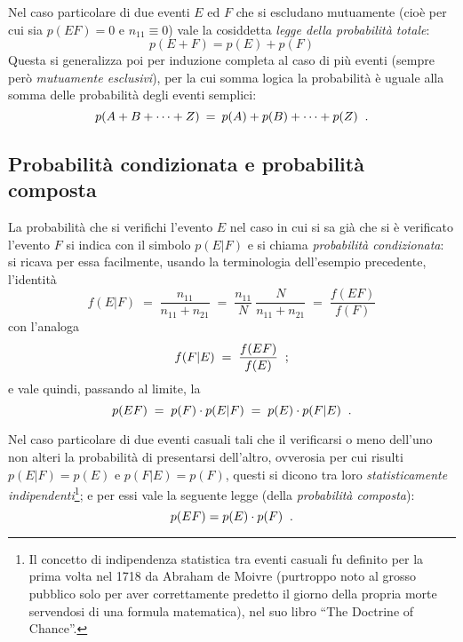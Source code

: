 Nel caso particolare di due eventi $E$ ed $F$ che si
escludano mutuamente (cio\`e per cui sia $p(EF) = 0$ e
$n_{11} \equiv 0$) vale la cosiddetta \emph{legge della
  probabilit\`a totale}:
\begin{equation*}
  p(E+F) = p(E)+p(F)
\end{equation*}
Questa si generalizza poi per induzione completa al caso di
pi\`u eventi (sempre per\`o \emph{mutuamente esclusivi}),
per la cui somma logica la probabilit\`a \`e uguale alla
somma delle probabilit\`a degli eventi semplici:
\begin{equation} \label{eq:3.protot}
  p(A+B+\cdots+Z) \: = \: p(A)+p(B)+\cdots+p(Z) \;\; .
\end{equation}%

\subsection{Probabilit\`a condizionata e probabilit\`a
  composta}
La probabilit\`a che si verifichi l'evento $E$ nel caso in
cui si sa gi\`a che si \`e verificato l'evento $F$ si indica
con il simbolo $p(E|F)$ e si chiama
\emph{probabilit\`a condizionata}:%
si ricava per essa facilmente, usando la terminologia
dell'esempio precedente, l'identit\`a
\begin{equation*}
  f(E|F) \; = \; \frac{n_{11}}{n_{11}+n_{21}}
  \; = \; \frac{n_{11}}{N} \: \frac{N}{n_{11}+n_{21}}
  \; = \; \frac{f(EF)}{f(F)}
\end{equation*}
con l'analoga
\begin{equation*}
  f(F|E) \; = \; \frac{f(EF)}{f(E)} \;\; ;
\end{equation*}
e vale quindi, passando al limite, la
\begin{equation}%
\index{probabilit\`a!composta (teorema della)|(}
\label{eq:3.leprco}
  p(EF) \; = \; p(F) \cdot p(E|F)
  \; = \; p(E) \cdot p(F|E) \peq .
\end{equation}

%
Nel caso particolare di due eventi casuali tali che il
verificarsi o meno dell'uno non alteri la probabilit\`a di
presentarsi dell'altro, ovverosia per cui risulti $p(E|F) =
p(E)$ e $p(F|E) = p(F)$, questi si dicono tra loro
\emph{statisticamente indipendenti}\/\thinspace\footnote{Il
  concetto di indipendenza statistica tra eventi casuali fu
  definito per la prima volta nel 1718 da Abraham de Moivre%
  (purtroppo noto al grosso pubblico solo per aver
  correttamente predetto il giorno della propria morte
  servendosi di una formula matematica), nel suo libro ``The
  Doctrine of Chance''.};%
e per essi vale la seguente legge (della \emph{probabilit\`a
  composta}):
\begin{equation*}
  p(EF) = p(E) \cdot p(F) \;\; .
\end{equation*}

